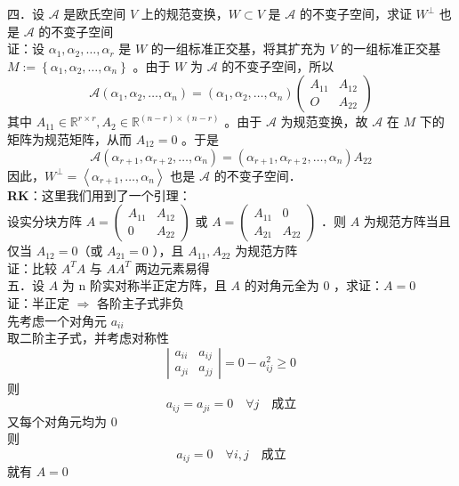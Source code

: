 \documentclass[UTF8]{ctexart}
\begin{document}
\noindent 四．设 $\mathcal{A}$ 是欧氏空间 $V$ 上的规范变换，$W \subset V$ 是 $\mathcal{A}$ 的不变子空间，求证 $W^{\perp}$ 也是 $\mathcal{A}$ 的不变子空间\\
证：设 $\alpha_{1}, \alpha_{2}, \ldots, \alpha_{r}$ 是 $W$ 的一组标准正交基，将其扩充为 $V$ 的一组标准正交基 $M:=\left\{\alpha_{1}, \alpha_{2}, \ldots, \alpha_{n}\right\}$ 。由于 $W$ 为 $\mathcal{A}$ 的不变子空间，所以
$$
\mathcal{A}\left(\alpha_{1}, \alpha_{2}, \ldots, \alpha_{n}\right)=\left(\alpha_{1}, \alpha_{2}, \ldots, \alpha_{n}\right)\left(\begin{array}{cc}
	A_{11} & A_{12} \\
	O & A_{22}
\end{array}\right)
$$
其中 $A_{11} \in \mathbb{R}^{r \times r}, A_{2} \in \mathbb{R}^{(n-r) \times(n-r)}$ 。由于 $\mathcal{A}$ 为规范变换，故 $\mathcal{A}$ 在 $M$ 下的矩阵为规范矩阵，从而 $A_{12}=0$ 。于是
$$
\mathcal{A}\left(\alpha_{r+1}, \alpha_{r+2}, \ldots, \alpha_{n}\right)=\left(\alpha_{r+1}, \alpha_{r+2}, \ldots, \alpha_{n}\right) A_{22}
$$
因此，$W^{\perp}=\left\langle\alpha_{r+1}, \ldots, \alpha_{n}\right\rangle$ 也是 $\mathcal{A}$ 的不变子空间．\\
\textbf{RK}：这里我们用到了一个引理：\\
设实分块方阵 $A=\left(\begin{array}{cc}A_{11} & A_{12} \\ 0 & A_{22}\end{array}\right)$ 或 $A=\left(\begin{array}{cc}A_{11} & 0 \\ A_{21} & A_{22}\end{array}\right)$ ．则 $A$ 为规范方阵当且仅当 $A_{12}=0$（或 $A_{21}=0$ ），且 $A_{11}, A_{22}$ 为规范方阵\\
证：比较 $A^{T} A$ 与 $A A^{T}$ 两边元素易得\\



\noindent 五．设 $A$ 为 n 阶实对称半正定方阵，且 $A$ 的对角元全为 0 ，求证：$A=0$\\
证：半正定 $\Rightarrow$ 各阶主子式非负\\
先考虑一个对角元 $a_{i i}$\\
取二阶主子式，并考虑对称性 $$\left|\begin{array}{ll}a_{i i} & a_{i j} \\ a_{j i} & a_{j j}\end{array}\right|=0-a_{i j}^{2} \geq 0$$
则
$$ a_{i j}=a_{j i}=0 \quad \forall j \quad \text{成立}$$
又每个对角元均为 0\\
则 $$a_{i j}=0 \quad \forall i, j \quad \text{成立}$$
就有 $A=0$\\
\end{document}

